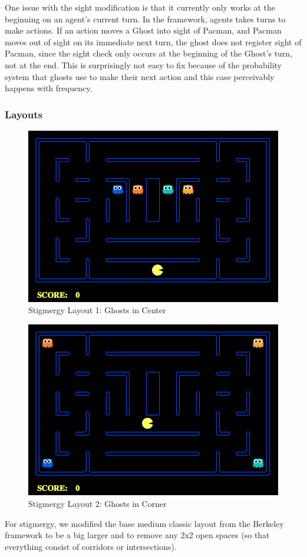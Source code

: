 \documentclass[11pt]{article}
\begin{document}
\begin{multicols}{2}
One issue with the sight modification is that it currently only works at the beginning on an agent's current turn. In the framework, agents takes turns to make actions.  If an action moves a Ghost into sight of Pacman, and Pacman moves out of sight on its immediate next turn, the ghost does not register sight of Pacman, since the sight check only occurs at the beginning of the Ghost's turn, not at the end.  This is surprisingly not easy to fix because of the probability system that ghosts use to make their next action and this case perceivably happens with frequency.

\subsubsection{Layouts}
\begin{figure}[H]
	\includegraphics[width=\columnwidth]{StigmergyClassic1.png}
	\caption{Stigmergy Layout 1: Ghosts in Center}
	\label{fig:stigmap1}
\end{figure}
\begin{figure}[H]
	\includegraphics[width=\columnwidth]{StigmergyClassic2.png}
	\caption{Stigmergy Layout 2: Ghosts in Corner}
	\label{fig:stigmap2}
\end{figure}
For stigmergy, we modified the base medium classic layout from the Berkeley framework to be a big larger and to remove any 2x2 open spaces (so that everything consist of corridors or intersections).   


\end{multicols}
\end{document}
